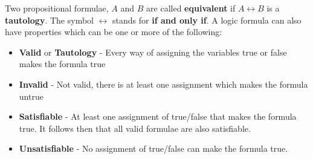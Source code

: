 \documentclass{article}
\begin{document}
Two propositional formulae, $A$ and $B$ are called \textbf{equivalent} if $A\leftrightarrow B$ is a \textbf{tautology}. The symbol $\leftrightarrow$ stands for \textbf{if and only if}. A logic formula can also have properties which can be one or more of the following:
\begin{itemize}
\item \textbf{Valid} or \textbf{Tautology} - Every way of assigning the variables true or false makes the formula true
\item \textbf{Invalid} - Not valid, there is at least one assignment which makes the formula untrue
\item \textbf{Satisfiable} - At least one assignment of true/false that makes the formula true. It follows then that all valid formulae are also satisfiable.
\item \textbf{Unsatisfiable} - No assignment of true/false can make the formula true.
\end{itemize}
\end{document}
